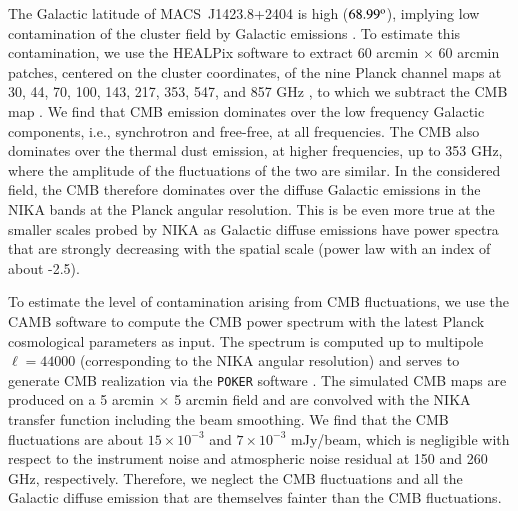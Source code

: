 \documentclass[traditabstract]{aa}
\begin{document}
The Galactic latitude of \mbox{MACS~J1423.8+2404} is high ($68.99^{\rm o}$), implying  low contamination of the cluster field by Galactic emissions \citep{planck2015X}. To estimate this contamination, we use the HEALPix software \citep{gorski2005} to extract 60 arcmin $\times$ 60 arcmin patches, centered on the cluster coordinates, of the nine Planck channel maps at 30, 44, 70, 100, 143, 217, 353, 547, and 857 GHz \citep{planck2015I}, to which we subtract the CMB map \citep{planck2015IX}. We find that CMB emission dominates over the low frequency Galactic components, i.e., synchrotron and free-free, at all frequencies. The CMB also dominates over the thermal dust emission, at higher frequencies, up to 353 GHz, where the amplitude of the fluctuations of the two are similar. In the considered field, the CMB therefore dominates over the diffuse Galactic emissions in the NIKA bands at the Planck angular resolution. This is be even more true at the smaller scales probed by NIKA as Galactic diffuse emissions have power spectra that are strongly decreasing with the spatial scale (power law with an index of about -2.5).

To estimate the level of contamination arising from CMB fluctuations, we use the CAMB software \citep{lewis2000} to compute the CMB power spectrum with the latest Planck cosmological parameters \citep{planck2014param} as input. The spectrum is computed up to multipole $\ell = 44000$ (corresponding to the NIKA angular resolution) and serves to generate CMB realization via the {\tt POKER} software \citep{ponthieu2011}. The simulated CMB maps are produced on a 5 arcmin $\times$ 5 arcmin field and are convolved with the NIKA transfer function including the beam smoothing. We find that the CMB fluctuations are about $15 \times 10^{-3}$ and $7 \times 10^{-3}$ mJy/beam, which is negligible with respect to the instrument noise and atmospheric noise residual at 150 and 260 GHz, respectively. Therefore, we neglect the CMB fluctuations and all the Galactic diffuse emission that are themselves fainter than the CMB fluctuations.
\end{document}
